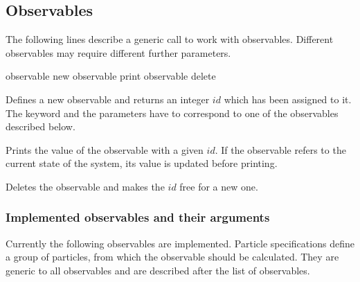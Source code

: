 \subsection{Observables}
\label{ssec:observable}

The following lines describe a generic call to work with 
observables. Different observables may require different further parameters.
\begin{essyntax}
   observable new  
   observable  print 
   observable  delete
\end{essyntax}
  
Defines a new observable and returns an integer $id$ which has been assigned to it.
The keyword  and the parameters have to correspond to one of the
observables described below.

 Prints the value of the observable with a given $id$. If the observable
refers to the current state of the system, its value is updated before printing.

 Deletes the observable and makes the $id$ free for a new one.

\subsubsection{Implemented observables and their arguments}
Currently the following observables are implemented.
Particle specifications define a group of particles, from which
the observable should be calculated. They are generic to all 
observables and are described after the list of observables.

